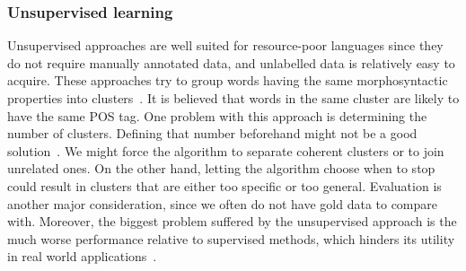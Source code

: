 \documentclass[12pt,twoside,final,hidelinks]{ltthesis}
\theoremstyle{definition}
\begin{document}
\subsubsection{Unsupervised learning}
Unsupervised approaches are well suited for resource-poor languages since they do not require manually annotated data, and unlabelled data is relatively easy to acquire. These approaches try to group words having the same morphosyntactic properties into clusters~\cite{Christodoulopoulos:2010,unSupPOSClustering,chineseWhisper}. It is believed that words in the same cluster are likely to have the same POS tag. One problem with this approach is determining the number of clusters. Defining that number beforehand might not be a good solution~\cite{unSupPOSClustering}. We might force the algorithm to separate coherent clusters or to join unrelated ones. On the other hand, letting the algorithm choose when to stop could result in clusters that are either too specific or too general. Evaluation is another major consideration, since we often do not have gold data to compare with. %
Moreover, the biggest problem suffered by the unsupervised approach is the much worse performance relative to supervised methods, which hinders its utility in real world applications~\cite{Christodoulopoulos:2010,Blunsom:2011}. %
\end{document}
